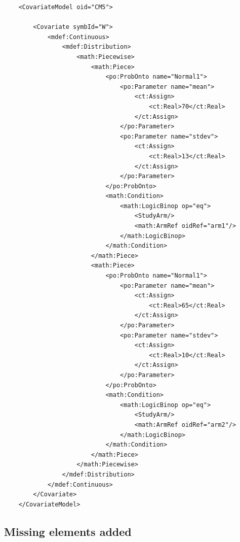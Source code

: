 \lstset{language=XML}
\begin{lstlisting}
    <CovariateModel oid="CM5">

        <Covariate symbId="W">
            <mdef:Continuous>
                <mdef:Distribution>
                    <math:Piecewise>
                        <math:Piece>
                            <po:ProbOnto name="Normal1">
                                <po:Parameter name="mean">
                                    <ct:Assign>
                                        <ct:Real>70</ct:Real>
                                    </ct:Assign>
                                </po:Parameter>
                                <po:Parameter name="stdev">
                                    <ct:Assign>
                                        <ct:Real>13</ct:Real>
                                    </ct:Assign>
                                </po:Parameter>
                            </po:ProbOnto>
                            <math:Condition>
                                <math:LogicBinop op="eq">
                                    <StudyArm/>
                                    <math:ArmRef oidRef="arm1"/>
                                </math:LogicBinop>
                            </math:Condition>
                        </math:Piece>
                        <math:Piece>
                            <po:ProbOnto name="Normal1">
                                <po:Parameter name="mean">
                                    <ct:Assign>
                                        <ct:Real>65</ct:Real>
                                    </ct:Assign>
                                </po:Parameter>
                                <po:Parameter name="stdev">
                                    <ct:Assign>
                                        <ct:Real>10</ct:Real>
                                    </ct:Assign>
                                </po:Parameter>
                            </po:ProbOnto>
                            <math:Condition>
                                <math:LogicBinop op="eq">
                                    <StudyArm/>
                                    <math:ArmRef oidRef="arm2"/>
                                </math:LogicBinop>
                            </math:Condition>
                        </math:Piece>
                    </math:Piecewise>
                </mdef:Distribution>
            </mdef:Continuous>
        </Covariate>
    </CovariateModel>
\end{lstlisting}


\subsection{Missing elements added}
\label{subsec:DeltaTime}

